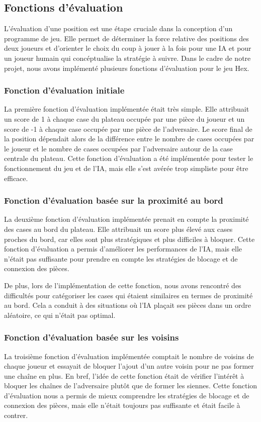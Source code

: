 \subsection{Fonctions d'évaluation}

L'évaluation d'une position est une étape cruciale dans la conception d'un programme de jeu. 
Elle permet de déterminer la force relative des positions des deux joueurs et d'orienter le choix du coup à jouer à la fois
pour une IA et pour un joueur humain qui concéptualise la stratégie à suivre.
Dans le cadre de notre projet, nous avons implémenté plusieurs fonctions d'évaluation pour le jeu Hex.

\subsubsection{Fonction d'évaluation initiale}
La première fonction d'évaluation implémentée était très simple. Elle attribuait un score de 1 à chaque case du plateau
occupée par une pièce du joueur et un score de -1 à chaque case occupée par une pièce de l'adversaire.
Le score final de la position dépendait alors de la différence entre le nombre de cases occupées par le joueur
et le nombre de cases occupées par l'adversaire autour de la case centrale du plateau.
Cette fonction d'évaluation a été implémentée pour tester le fonctionnement du jeu et de l'IA, mais elle s'est avérée
trop simpliste pour être efficace.

\subsubsection{Fonction d'évaluation basée sur la proximité au bord}
La deuxième fonction d'évaluation implémentée prenait en compte la proximité des cases au bord du plateau.
Elle attribuait un score plus élevé aux cases proches du bord, car elles sont plus stratégiques et plus difficiles à bloquer.
Cette fonction d'évaluation a permis d'améliorer les performances de l'IA, mais elle n'était pas suffisante pour
prendre en compte les stratégies de blocage et de connexion des pièces.

De plus, lors de l'implémentation de cette fonction, nous avons rencontré des difficultés pour catégoriser les cases
qui étaient similaires en termes de proximité au bord. Cela a conduit à des situations où l'IA plaçait ses pièces
dans un ordre aléatoire, ce qui n'était pas optimal.

\subsubsection{Fonction d'évaluation basée sur les voisins}
La troisième fonction d'évaluation implémentée comptait le nombre de voisins de chaque joueur et essayait de bloquer
l'ajout d'un autre voisin pour ne pas former une chaîne en plus. En bref, l'idée de cette fonction était de vérifier
l'intérêt à bloquer les chaînes de l'adversaire plutôt que de former les siennes.
Cette fonction d'évaluation nous a permis de mieux comprendre les stratégies de blocage et de connexion des pièces,
mais elle n'était toujours pas suffisante et était facile à contrer.

